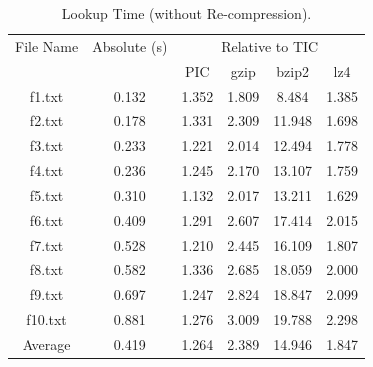 \begin{table}[ht]
\centering
\begin{tabular}{cccccc}
\hline
File Name & Absolute (s) & \multicolumn{4}{c}{Relative to TIC} \\
 &  & PIC & gzip & bzip2 & lz4 \\
\hline
f1.txt & 0.132 & 1.352 & 1.809 & 8.484 & 1.385 \\
f2.txt & 0.178 & 1.331 & 2.309 & 11.948 & 1.698 \\
f3.txt & 0.233 & 1.221 & 2.014 & 12.494 & 1.778 \\
f4.txt & 0.236 & 1.245 & 2.170 & 13.107 & 1.759 \\
f5.txt & 0.310 & 1.132 & 2.017 & 13.211 & 1.629 \\
f6.txt & 0.409 & 1.291 & 2.607 & 17.414 & 2.015 \\
f7.txt & 0.528 & 1.210 & 2.445 & 16.109 & 1.807 \\
f8.txt & 0.582 & 1.336 & 2.685 & 18.059 & 2.000 \\
f9.txt & 0.697 & 1.247 & 2.824 & 18.847 & 2.099 \\
f10.txt & 0.881 & 1.276 & 3.009 & 19.788 & 2.298 \\
Average & 0.419 & 1.264 & 2.389 & 14.946 & 1.847 \\
\hline
\end{tabular}
\caption{Lookup Time (without Re-compression).}
\label{tab:lookup_no_recompression}
\end{table}
